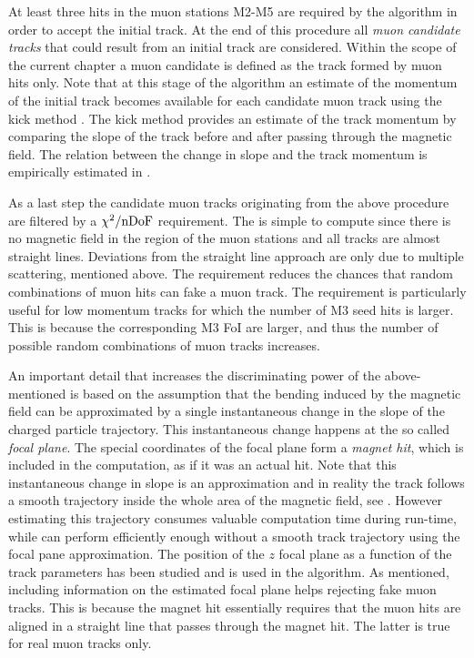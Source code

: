 At least three hits in the muon stations M2-M5 are required by the \mvm algorithm in order to accept the initial \velo track.
At the end of this procedure all {\it muon candidate tracks} that could result from an initial \velo track are considered.
Within the scope of the current chapter a muon candidate is defined as the track formed by muon hits only.
Note that at this stage of the algorithm an estimate of the momentum of the initial \velo track becomes available
for each candidate muon track using the kick method \cite{Hommels:999327}. The kick method provides an estimate
of the track momentum by comparing the slope of the track before and after passing through the \lhcb magnetic
field. The relation between the change in slope and the track momentum is empirically estimated in \cite{roelThesis}.

As a last step the candidate muon tracks originating from the above procedure are filtered by a $\chi^2/\rm nDoF$
requirement. The \chisq is simple to compute since there is no magnetic field in the region of the muon stations
and all tracks are almost straight lines. Deviations from the straight line approach are only due to
multiple scattering, mentioned above. The \chisq requirement reduces the chances that random combinations of muon hits
can fake a muon track. The requirement is particularly useful for low momentum tracks for which the number
of M3 seed hits is larger. This is because the corresponding M3 FoI are larger, and thus the number of possible
random combinations of muon tracks increases.

An important detail that increases the discriminating power of the above-mentioned \chisq is based on the
assumption that the bending induced by the \lhcb magnetic field can be approximated by a single instantaneous
change in the slope of the charged particle trajectory. This instantaneous change happens at the so called
{\it focal plane}. The special coordinates of the focal plane form a {\it magnet hit}, which is included in
the \chisq computation, as if it was an actual hit. Note that this instantaneous change in slope is an approximation
and in reality the track follows a smooth trajectory inside the whole area of the magnetic field, see .
However estimating this trajectory consumes valuable computation time during \hltone run-time, while \mvm can perform
efficiently enough without a smooth track trajectory using the focal
pane approximation. The position of the $z$ focal plane as a function of the track parameters has been studied
\cite{Hommels:999327} and is used in the \mvm algorithm. As mentioned, including information on the estimated
focal plane helps rejecting fake muon tracks. This is because the magnet hit essentially requires that the
muon hits are aligned in a straight line that passes through the magnet hit. The latter is true for real muon tracks only.

